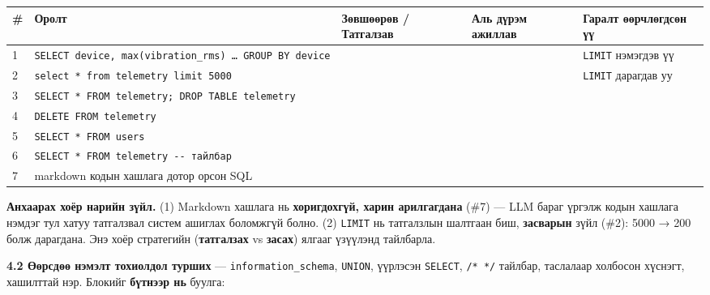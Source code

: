 \begingroup\scriptsize\begin{longtable}[]{@{}lllll@{}}
\toprule
\# & Оролт & Зөвшөөрөв / Татгалзав & Аль дүрэм ажиллав & Гаралт өөрчлөгдсөн үү\tabularnewline
\midrule
\endhead
1 & \texttt{SELECT\ device,\ max(vibration\_\allowbreak{}rms)\ \ldots{}\ GROUP\ BY\ device} & & & \texttt{LIMIT} нэмэгдэв үү\tabularnewline
2 & \texttt{select\ *\ from\ telemetry\ limit\ 5000} & & & \texttt{LIMIT} дарагдав уу\tabularnewline
3 & \texttt{SELECT\ *\ FROM\ telemetry;\ DROP\ TABLE\ telemetry} & & &\tabularnewline
4 & \texttt{DELETE\ FROM\ telemetry} & & &\tabularnewline
5 & \texttt{SELECT\ *\ FROM\ users} & & &\tabularnewline
6 & \texttt{SELECT\ *\ FROM\ telemetry\ -\/\allowbreak{}-\ тайлбар} & & &\tabularnewline
7 & markdown кодын хашлага дотор орсон SQL & & &\tabularnewline
\bottomrule
\end{longtable}\endgroup

\textbf{Анхаарах хоёр нарийн зүйл.} (1) Markdown хашлага нь \textbf{хоригдохгүй, харин арилгагдана} (\#7) --- LLM бараг үргэлж кодын хашлага нэмдэг тул хатуу татгалзвал систем ашиглах боломжгүй болно. (2) \texttt{LIMIT} нь татгалзлын шалтгаан биш, \textbf{засварын} зүйл (\#2): 5000 → 200 болж дарагдана. Энэ хоёр стратегийн (\textbf{татгалзах} vs \textbf{засах}) ялгааг үзүүлэнд тайлбарла.

\textbf{4.2 Өөрсдөө нэмэлт тохиолдол турших} --- \texttt{information\_\allowbreak{}schema}, \texttt{UNION}, үүрлэсэн \texttt{SELECT}, \texttt{/*\ */} тайлбар, таслалаар холбосон хүснэгт, хашилттай нэр. Блокийг \textbf{бүтнээр нь} буулга:

\begin{Shaded}
\begin{Highlighting}[]
\NormalTok{ {-} } \KeywordTok{|} 
\NormalTok{for c in ["SELECT * FROM information\_schema.}
\StringTok{"]:}
\end{Highlighting}
\end{Shaded}

